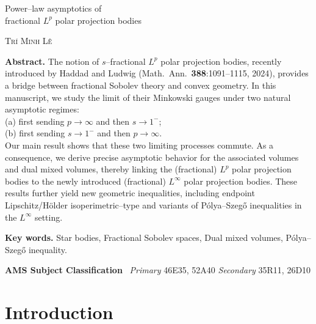 \documentclass[11pt, reqno]{article}
\theoremstyle{definition}
\numberwithin{equation}{section}
\begin{document}
\begin{center}
{\LARGE Power--law asymptotics of \\ fractional $L^p$ polar projection bodies }%
\end{center}
\smallskip
\begin{center}
{\Large \textsc{Tr\'i Minh L\^e}}
\end{center}


\bigskip

\noindent\textbf{Abstract.} 
The notion of $s$--fractional $L^p$ polar projection bodies, recently introduced by Haddad and Ludwig (Math.\ Ann.\ \textbf{388}:1091--1115, 2024), provides a bridge between fractional Sobolev theory and convex geometry.
In this manuscript, we study the limit of their Minkowski gauges under two natural asymptotic regimes: 
\\
\hspace*{3em} (a) first sending $p \to \infty$ and then $s \to 1^-$; \\ 
\hspace*{3em} (b) first sending $s \to 1^-$ and then $p \to \infty$. \\
Our main result shows that these two limiting processes commute.
As a consequence, we derive precise asymptotic behavior for the associated volumes and dual mixed volumes, thereby linking the (fractional) $L^p$ polar projection bodies to the newly introduced (fractional)  $L^\infty$ polar projection bodies.
These results further yield new geometric inequalities, including endpoint Lipschitz/Hölder isoperimetric--type and variants of Pólya--Szeg\H{o} inequalities in the $L^\infty$ setting.
\bigskip


\noindent\textbf{Key words.} Star bodies, Fractional Sobolev spaces, Dual mixed volumes, P\'olya--Szeg\H{o} inequality.

\vspace{0.6cm}

\noindent\textbf{AMS Subject Classification} \ \textit{Primary} 46E35, 52A40
\textit{Secondary} 35R11, 26D10


\section{Introduction}
\end{document}
